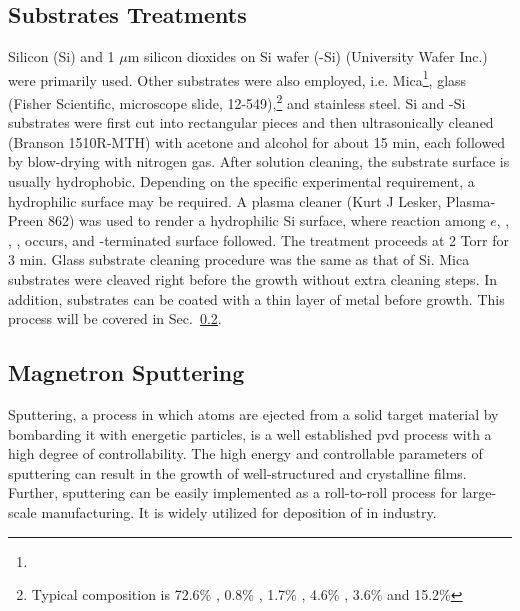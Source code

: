 \subsection{Substrates Treatments}\label{ch2sub}

Silicon (Si) and 1 $\mu$m silicon dioxides on Si wafer (-Si) (University Wafer Inc.) were primarily used. Other substrates were also employed, i.e. Mica\footnote{}, glass (Fisher Scientific, microscope slide, 12-549),\footnote{Typical composition is 72.6\% , 0.8\% , 1.7\% , 4.6\% , 3.6\%  and 15.2\% } and stainless steel. Si and -Si substrates were first cut into rectangular pieces and then ultrasonically cleaned (Branson 1510R-MTH) with acetone and alcohol for about 15 min, each followed by blow-drying with nitrogen gas. After solution cleaning, the substrate surface is usually hydrophobic. Depending on the specific experimental requirement, a hydrophilic surface may be required. A plasma cleaner (Kurt J Lesker, Plasma-Preen 862) was used to render a hydrophilic Si surface, where reaction among $e$, , , , occurs, and -terminated surface followed.\cite{Habib2010} The treatment proceeds at 2 Torr  for 3 min. Glass substrate cleaning procedure was the same as that of Si. Mica substrates were cleaved right before the growth without extra cleaning steps. In addition, substrates can be coated with a thin layer of metal before growth. This process will be covered in Sec.~\ref{sec:mag}.

\subsection{Magnetron Sputtering}\label{sec:mag}
Sputtering, a process in which atoms are ejected from a solid target material by bombarding it with energetic particles, is a well established \gls{pvd} process with a high degree of controllability. The high energy and controllable parameters of sputtering can result in the growth of well-structured and crystalline films. Further, sputtering can be easily implemented as a roll-to-roll process for large-scale manufacturing. It is widely utilized for deposition of  in industry.

